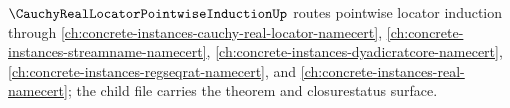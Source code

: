 $\CauchyRealLocatorPointwiseInductionUp$ routes pointwise locator induction through \autoref{ch:concrete-instances-cauchy-real-locator-namecert}, \autoref{ch:concrete-instances-streamname-namecert}, \autoref{ch:concrete-instances-dyadicratcore-namecert}, \autoref{ch:concrete-instances-regseqrat-namecert}, and \autoref{ch:concrete-instances-real-namecert}; the child file carries the theorem and closurestatus surface.

